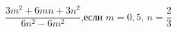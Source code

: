 \begin{ex}[type=simplify_calculate]
	\begin{condition}
		\( \dfrac{3m^2+6mn+3n^2}{6n^2-6m^2} \),\quad если \( m=0,5 \), \( n=\dfrac{2}{3} \)
	\end{condition}
\end{ex}